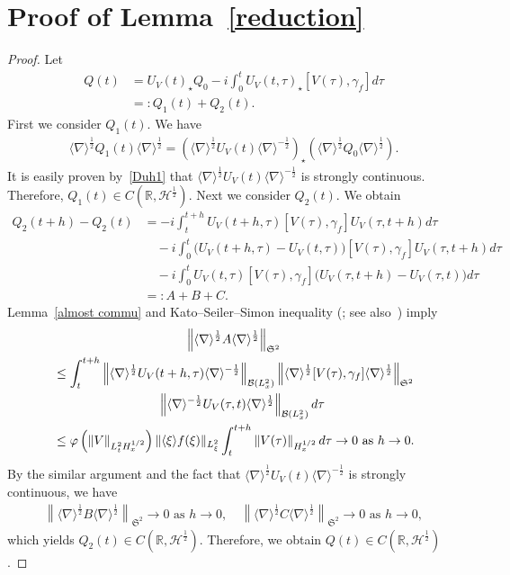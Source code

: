 \documentclass[10pt,a4paper]{amsart}
\newcommand{\BR}{\mathbb{R}}
\newcommand{\CB}{\mathcal{B}}
\newcommand{\CH}{\mathcal{H}}
\newcommand{\FS}{\mathfrak{S}}
\newcommand{\ga}{\gamma}
\newcommand{\ph}{\varphi}
\newcommand{\ta}{\tau}
\newcommand{\sd}{\langle \nabla \rangle}
\newcommand{\lxr}{\langle \xi \rangle}
\newcommand{\st}{\star}
\newcommand{\tw}{\frac{1}{2}}
\begin{document}
\section{Proof of Lemma~\ref{reduction}}\label{sect6}
\begin{proof}
Let
\begin{align}
Q(t) &= U_V(t)_\st Q_0 - i\int_0^t U_V(t,\ta)_\st [V(\ta),\ga_f] d\ta \\
&=: Q_1(t) + Q_2(t).
\end{align}
First we consider $Q_1(t)$. We have
\begin{align}
\sd^\tw Q_1(t) \sd^\tw = \left(\sd^\tw U_V(t) \sd^{-\tw}\right)_\st \left(\sd^\tw Q_0 \sd^\tw\right).
\end{align}
It is easily proven by~\eqref{Duh1} that $\sd^\tw U_V(t) \sd^{-\tw}$ is strongly continuous. Therefore, $Q_1(t) \in C(\BR, \CH^\tw)$. Next we consider $Q_2(t)$. We obtain
\begin{equation}
\begin{split}
Q_2(t+h) - Q_2(t) &= -i \int_t^{t+h} U_V(t+h,\ta)[V(\ta),\ga_f]U_V(\ta,t+h) d\ta \\
&\quad -i \int_0^t \big(U_V(t+h,\ta)-U_V(t,\ta)\big)[V(\ta),\ga_f]U_V(\ta,t+h) d\ta \\
&\quad -i \int_0^t U_V(t,\ta)[V(\ta),\ga_f]\big(U_V(\ta,t+h)-U_V(\ta,t)\big) d\ta \\
&=: A + B + C.
\end{split}
\end{equation}
Lemma~\ref{almost commu} and Kato--Seiler--Simon inequality (\cite{1975SS}; see also~\cite[Theorem~4.1]{2005Simon}) imply
\begin{multline}
\left\|\sd^\tw A \sd^\tw\right\|_{\FS^2} \\
\begin{aligned}
&\le \int_t^{t+h} \left\|\sd^\tw U_V(t+h,\ta) \sd^{-\tw}\right\|_{\CB(L^2_x)}
\left\|\sd^\tw [V(\ta),\ga_f] \sd^\tw\right\|_{\FS^2}\\
&\mkern150mu
\left\|\sd^{-\tw} U_V(\ta,t) \sd^\tw\right\|_{\CB(L^2_x)} d\ta
\\
&\le \ph\left(\|V\|_{L^2_t H^{1/2}_x}\right) \|\lxr f(\xi)\|_{L^2_\xi} \int_t^{t+h} \left\|V(\ta)\right\|_{H^{1/2}_x}d\ta
\to 0 \text{ as } h \to 0.
\end{aligned}
\end{multline}
By the similar argument and the fact that $\sd^\tw U_V(t) \sd^{-\tw}$ is strongly continuous, we have
\begin{align}
\left\|\sd^\tw B \sd^\tw\right\|_{\FS^2} \to 0 \text{ as } h \to 0, \quad
\left\|\sd^\tw C \sd^\tw\right\|_{\FS^2} \to 0 \text{ as } h \to 0,
\end{align}
which yields $Q_2(t) \in C(\BR, \CH^\tw)$. Therefore, we obtain $Q(t) \in C(\BR, \CH^\tw)$.


\end{proof}
\end{document}
